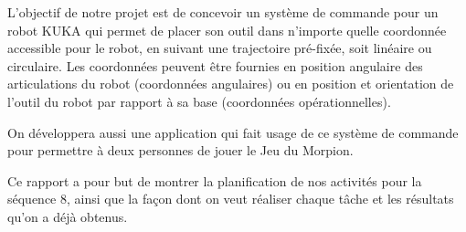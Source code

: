 

L'objectif de notre projet est de concevoir un système de commande pour un robot KUKA qui permet de placer son outil dans n'importe quelle coordonnée accessible pour le robot, en suivant une trajectoire pré-fixée, soit linéaire ou circulaire. Les coordonnées peuvent être fournies en position angulaire des articulations du robot (coordonnées angulaires) ou en position et orientation de l'outil du robot par rapport à sa base (coordonnées opérationnelles). 

On développera aussi une application qui fait usage de ce système de commande pour permettre à deux personnes de jouer le Jeu du Morpion.

Ce rapport a pour but de montrer la planification de nos activités pour la séquence 8, ainsi que la façon dont on veut réaliser chaque tâche et les résultats qu'on a déjà obtenus.\newpage